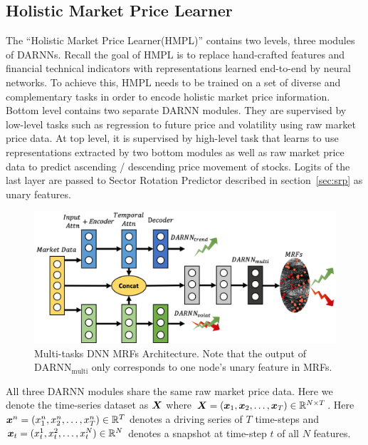 \documentclass[sigconf,anonymous,review]{acmart}
\renewcommand{\cite}{\citep}
\begin{document}
\subsection{Holistic Market Price Learner}
\label{sec:hmpl}

The ``Holistic Market Price Learner(HMPL)'' contains two levels,
three modules of DARNNs\cite{qin2017dual}. Recall the goal of
HMPL is to replace hand-crafted features and financial technical
indicators with representations learned end-to-end by neural
networks. To achieve this, HMPL needs to be trained on a set of
diverse and complementary tasks in order to encode holistic
market price information. Bottom level contains two separate
DARNN modules. They are supervised by low-level tasks such as
regression to future price and volatility using raw market price
data. At top level, it is supervised by high-level task that
learns to use representations extracted by two bottom modules as
well as raw market price data to predict ascending / descending
price movement of stocks. Logits of the last layer are passed to
Sector Rotation Predictor described in section~\ref{sec:srp} as
unary features.

\begin{figure}[t]
  \centering
  \includegraphics[width=1\columnwidth]{Methodology/figures/hmplmrf.png}
  \caption{\label{fig:mrfrnn} Multi-tasks DNN MRFs Architecture. Note 
  that the output of $\text{DARNN}_{\text{multi}}$ only corresponds to one 
  node's unary feature in MRFs.}
\end{figure}

All three DARNN modules share the same raw market price data.
Here we denote the time-series dataset as ${\boldsymbol{X}}$ where
${\boldsymbol{X}}=({\boldsymbol{x}}_1,{\boldsymbol{x}}_2,\dots,{\boldsymbol{x}}_T)\in \mathbb{R}^{N\times T}$. Here
${\boldsymbol{x}}^n=(x_1^n,x_2^n,\dots,x_T^n) \in \mathbb{R}^T$ denotes a driving
series of $T$ time-steps and ${\boldsymbol{x}}_t=(x_t^1,x_t^2\\ ,\dots
,x_t^N)\in \mathbb{R}^N$ denotes a snapshot at time-step $t$ of all
$N$ features.
\end{document}
